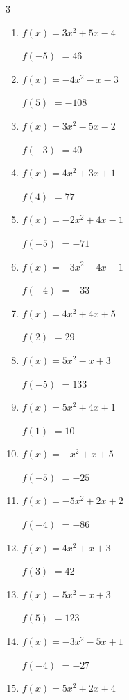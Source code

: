 \begin{multicols}{3}
\begin{enumerate}
$f(1)$
        $= -7$

\columnbreak %

\resetques

  \item $f(x)=3x^{2}+5x-4$

$f(-5)$
        $= 46$

  \item $f(x)=-4x^{2}-x-3$

$f(5)$
        $= -108$

  \item $f(x)=3x^{2}-5x-2$

$f(-3)$
        $= 40$

  \item $f(x)=4x^{2}+3x+1$

$f(4)$
        $= 77$

  \item $f(x)=-2x^{2}+4x-1$

$f(-5)$
        $= -71$

  \item $f(x)=-3x^{2}-4x-1$

$f(-4)$
        $= -33$

  \item $f(x)=4x^{2}+4x+5$

$f(2)$
        $= 29$

  \item $f(x)=5x^{2}-x+3$

$f(-5)$
        $= 133$

  \item $f(x)=5x^{2}+4x+1$

$f(1)$
        $= 10$

  \item $f(x)=-x^{2}+x+5$

$f(-5)$
        $= -25$

  \item $f(x)=-5x^{2}+2x+2$

$f(-4)$
        $= -86$

  \item $f(x)=4x^{2}+x+3$

$f(3)$
        $= 42$

  \item $f(x)=5x^{2}-x+3$

$f(5)$
        $= 123$

  \item $f(x)=-3x^{2}-5x+1$

$f(-4)$
        $= -27$

  \item $f(x)=5x^{2}+2x+4$


\end{enumerate}
\end{multicols}
